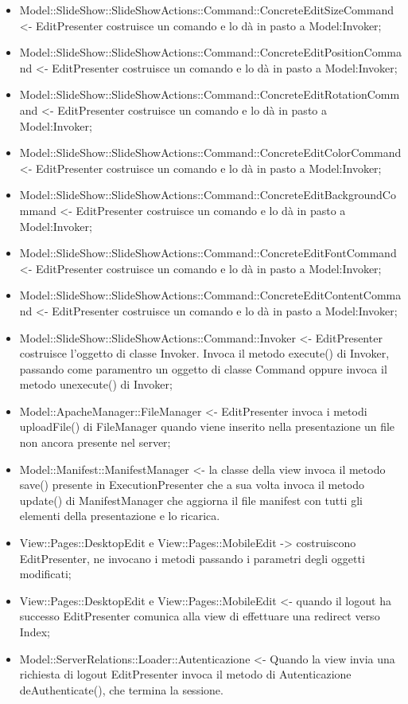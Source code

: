 {{\begin{itemize}
			\item Model::SlideShow::SlideShowActions::Command::ConcreteEditSizeCommand <- EditPresenter costruisce un comando e lo dà in pasto a Model:Invoker;
			\item Model::SlideShow::SlideShowActions::Command::ConcreteEditPositionCommand <- EditPresenter costruisce un comando e lo dà in pasto a Model:Invoker;
			\item Model::SlideShow::SlideShowActions::Command::ConcreteEditRotationCommand <- EditPresenter costruisce un comando e lo dà in pasto a Model:Invoker;
			\item Model::SlideShow::SlideShowActions::Command::ConcreteEditColorCommand <- EditPresenter costruisce un comando e lo dà in pasto a Model:Invoker;
			\item Model::SlideShow::SlideShowActions::Command::ConcreteEditBackgroundCommand <- EditPresenter costruisce un comando e lo dà in pasto a Model:Invoker;
			\item Model::SlideShow::SlideShowActions::Command::ConcreteEditFontCommand <- EditPresenter costruisce un comando e lo dà in pasto a Model:Invoker;
			\item Model::SlideShow::SlideShowActions::Command::ConcreteEditContentCommand <- EditPresenter costruisce un comando e lo dà in pasto a Model:Invoker;
			\item Model::SlideShow::SlideShowActions::Command::Invoker <- EditPresenter costruisce l’oggetto di classe Invoker. Invoca il metodo execute() di Invoker, passando come paramentro un oggetto di classe Command oppure invoca il metodo unexecute() di Invoker;
			\item Model::ApacheManager::FileManager <- EditPresenter invoca i metodi uploadFile() di FileManager quando viene inserito nella presentazione un file non ancora presente nel server;
			\item Model::Manifest::ManifestManager <- la classe della view invoca il metodo save() presente in  ExecutionPresenter che a sua volta invoca il metodo update() di ManifestManager che aggiorna il file manifest con tutti gli elementi della presentazione e lo ricarica.  												
			\item View::Pages::DesktopEdit e View::Pages::MobileEdit -> costruiscono EditPresenter, ne invocano i metodi passando i parametri degli oggetti modificati;
			\item View::Pages::DesktopEdit e View::Pages::MobileEdit <- quando il logout ha successo EditPresenter comunica alla view di effettuare una redirect verso Index;
			\item Model::ServerRelations::Loader::Autenticazione <- Quando la view invia una richiesta di logout EditPresenter invoca il metodo di Autenticazione deAuthenticate(), che termina la sessione.
			

\end{itemize}}}
